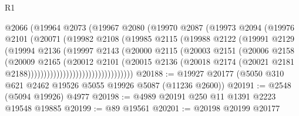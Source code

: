 \begin{lexlean}{R1}
\begin{coremodule}
                              @2066
                              (@19964
                                @2073
                                (@19967
                                  @2080
                                  (@19970
                                    @2087
                                    (@19973
                                      @2094
                                      (@19976
                                        @2101
                                        (@20071
                                          (@19982
                                            @2108
                                            (@19985
                                              @2115
                                              (@19988
                                                @2122
                                                (@19991
                                                  @2129
                                                  (@19994
                                                    @2136
                                                    (@19997
                                                      @2143
                                                      (@20000
                                                        @2115
                                                        (@20003
                                                          @2151
                                                          (@20006
                                                            @2158
                                                            (@20009
                                                              @2165
                                                              (@20012
                                                                @2101
                                                                (@20015
                                                                  @2136
                                                                  (@20018
                                                                    @2174
                                                                    (@20021
                                                                      @2181
                                                                      @2188)))))))))))))))))))))))))))))))))
@20188 := @19927 @20177 (@5050 @310 @621 @2462 @19526 @5055 @19926 @5087 (@11236 @2600))
@20191 := @2548 (@5094 @19926) @4977
@20198 := @4989 @20191 @250 @11 @1391 @2223 @19548 @19885
@20199 := @89 @19561
@20201 := @20198 @20199 @20177

\end{coremodule}
\end{lexlean}
